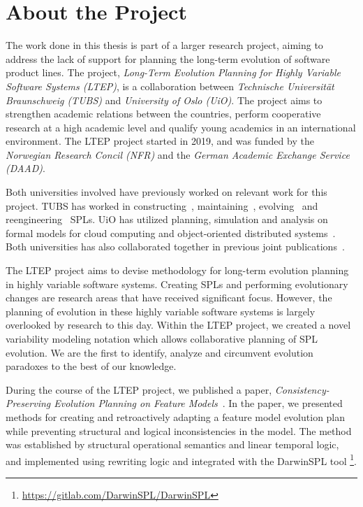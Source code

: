 \documentclass[a4paper,english]{ifimaster}
\begin{document}
\section{About the Project}%
\label{sec:about_the_project}

The work done in this thesis is part of a larger research project, aiming to address the lack of support for planning the long-term evolution of software product lines. The project, \textit{Long-Term Evolution Planning for Highly Variable Software Systems (LTEP)}, is a collaboration between \textit{Technische Universität Braunschweig (TUBS)} and \textit{University of Oslo (UiO)}. The project aims to strengthen academic relations between the countries, perform cooperative research at a high academic level and  qualify young academics in an international environment. The LTEP project started in 2019, and was funded by the \textit{Norwegian Research Concil (NFR)} and the \textit{German Academic Exchange Service (DAAD)}.

Both universities involved have previously worked on relevant work for this project. TUBS has worked in constructing~\cite{cite:s02_deltaecore, cite:s03_integrated_var_management}, maintaining~\cite{cite:s02_deltaecore, cite:s23_devprocess_for_maturing_delta_software}, evolving~\cite{cite:s26_context_aware_reconfig_spls, cite:s17_darwinspl} and reengineering~\cite{cite:s14_variability_in_oo, cite:s18_extractive_spl_engineering} SPLs. UiO has utilized planning, simulation and analysis on formal models for cloud computing and object-oriented distributed systems~\cite{cite:y02, cite:y09, cite:y08}. Both universities has also collaborated together in previous joint publications~\cite{cite:s26_context_aware_reconfig_spls, cite:y03_context_aware_reconfig_in_spl, cite:y07_hyvar}.

The LTEP project aims to devise methodology for long-term evolution planning in highly variable software systems. Creating SPLs and performing evolutionary changes are research areas that have received significant focus. However, the planning of evolution in these highly variable software systems is largely overlooked by research to this day. Within the LTEP project, we created a novel variability modeling notation which allows collaborative planning of SPL evolution. We are the first to identify, analyze and circumvent evolution paradoxes to the best of our knowledge.

During the course of the LTEP project, we published a paper, \textit{Consistency-Preserving Evolution Planning on Feature Models}~\cite{cite:consistency_preserving_evolution_planning}. In the paper, we presented methods for creating and retroactively adapting a feature model evolution plan while preventing structural and logical inconsistencies in the model. The method was established by structural operational semantics and linear temporal logic, and implemented using rewriting logic and integrated with the DarwinSPL tool \footnote{\url{https://gitlab.com/DarwinSPL/DarwinSPL}}.
\end{document}
